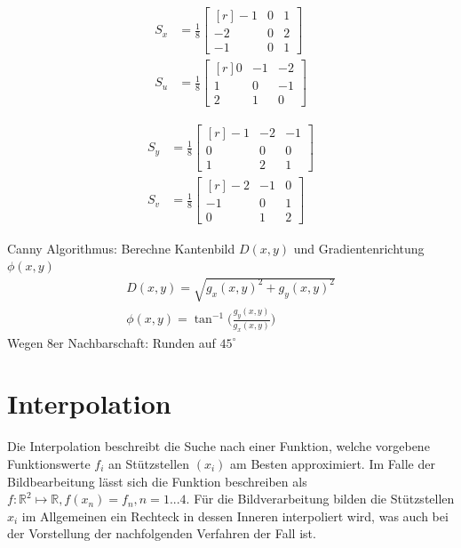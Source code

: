 \begin{multicols}{2}
\begin{align*}
 S_x &= \frac{1}{8} \begin{bmatrix}[r] -1&0&1 \\ -2&0&2 \\ -1&0&1 \end{bmatrix} \\
 S_u &= \frac{1}{8} \begin{bmatrix}[r] 0&-1&-2 \\ 1&0&-1 \\ 2&1&0 \end{bmatrix}
\end{align*}

\columnbreak

\begin{align*}
 S_y &= \frac{1}{8} \begin{bmatrix}[r] -1&-2&-1 \\ 0&0&0 \\ 1&2&1 \end{bmatrix} \\
 S_v &= \frac{1}{8} \begin{bmatrix}[r] -2&-1&0 \\ -1&0&1 \\ 0&1&2 \end{bmatrix}
\end{align*}
\end{multicols}

Canny Algorithmus: Berechne Kantenbild \(D(x, y)\) und Gradientenrichtung \( \phi(x, y) \)
\begin{eqnarray*}
D(x, y)=\sqrt{g_x(x, y)^2+g_y(x, y)^2} \\
\phi (x, y)= \tan^{-1}\bigg( \frac{g_y(x, y)}{g_x(x, y)} \bigg)
\end{eqnarray*}
Wegen 8er Nachbarschaft: Runden auf \( 45^\circ \)
\cite{imageprocessing_edgedetection}

\section{Interpolation}

Die Interpolation beschreibt die Suche nach einer Funktion, welche vorgebene Funktionswerte \( f_i \) an St\"utzstellen \( (x_i) \) am Besten approximiert. Im Falle der Bildbearbeitung l\"asst sich die Funktion beschreiben als 
\( f: \mathbb{R}^2\mapsto\mathbb{R}, f(x_n)=f_n, n=1...4 \). F\"ur die Bildverarbeitung bilden die St\"utzstellen \(x_i\) im Allgemeinen ein Rechteck in dessen Inneren interpoliert wird, was auch bei der Vorstellung der nachfolgenden Verfahren der Fall ist. 

